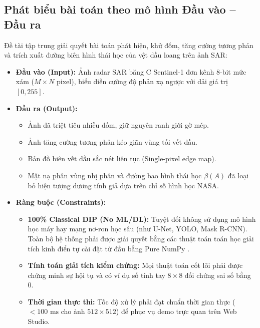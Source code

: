 \subsection{Phát biểu bài toán theo mô hình Đầu vào -- Đầu ra}
Đề tài tập trung giải quyết bài toán phát hiện, khử đốm, tăng cường tương phản và trích xuất đường biên hình thái học của vệt dầu loang trên ảnh SAR:
\begin{itemize}
    \item \textbf{Đầu vào (Input):} Ảnh radar SAR băng C Sentinel-1 đơn kênh 8-bit mức xám ($M \times N$ pixel), biểu diễn cường độ phản xạ ngược với dải giá trị $[0, 255]$.
    \item \textbf{Đầu ra (Output):}
    \begin{itemize}
        \item Ảnh đã triệt tiêu nhiễu đốm, giữ nguyên ranh giới gờ mép.
        \item Ảnh tăng cường tương phản kéo giãn vùng tối vết dầu.
        \item Bản đồ biên vết dầu sắc nét liên tục (Single-pixel edge map).
        \item Mặt nạ phân vùng nhị phân và đường bao hình thái học $\beta(A)$ đã loại bỏ hiện tượng dương tính giả dựa trên chỉ số hình học NASA.
    \end{itemize}
    \item \textbf{Ràng buộc (Constraints):}
    \begin{itemize}
        \item \textbf{100\% Classical DIP (No ML/DL):} Tuyệt đối không sử dụng mô hình học máy hay mạng nơ-ron học sâu (như U-Net, YOLO, Mask R-CNN). Toàn bộ hệ thống phải được giải quyết bằng các thuật toán toán học giải tích kinh điển tự cài đặt từ đầu bằng Pure NumPy \cite{utc2024dip}.
        \item \textbf{Tính toán giải tích kiểm chứng:} Mọi thuật toán cốt lõi phải được chứng minh sự hội tụ và có ví dụ số tính tay $8 \times 8$ đối chứng sai số bằng 0.
        \item \textbf{Thời gian thực thi:} Tốc độ xử lý phải đạt chuẩn thời gian thực ($< 100\text{ ms}$ cho ảnh $512 \times 512$) để phục vụ demo trực quan trên Web Studio.
    \end{itemize}
\end{itemize}




